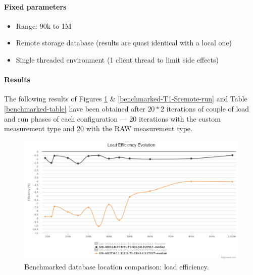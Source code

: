 \documentclass[a4paper,11pt]{report}
\begin{document}
\paragraph{Fixed parameters}
\begin{itemize}
\item
Range: 90k to 1M
\item
Remote storage database (results are quasi identical with a local one)
\item
Single threaded environment (1 client thread to limit side effects)
\end{itemize}


\paragraph{Results}

The following results of Figures \ref{benchmarked-T1-Sremote-load}  \& \ref{benchmarked-T1-Sremote-run} and Table \ref{benchmarked-table} have been obtained after $20*2$ iterations of couple of load and run phases of each configuration --- 20 iterations with the custom measurement type and 20 with the RAW measurement type.

\begin{figure}[ht]
\begin{center}
\includegraphics[width=1\linewidth]{images/evaluation/benchmarked-T1-Sremote-load.png}
\caption{Benchmarked database location comparison: load efficiency.}
\label{benchmarked-T1-Sremote-load}
\end{center}
\end{figure}
\end{document}
